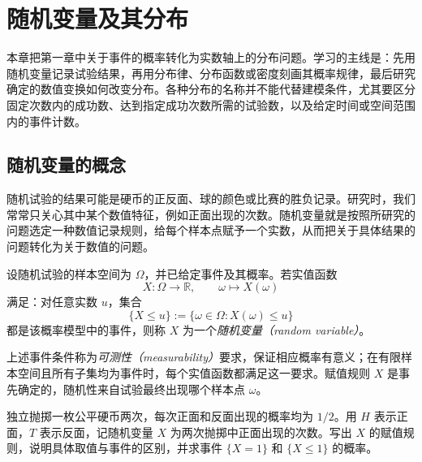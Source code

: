\setcounter{chapter}{1} %
\chapter{随机变量及其分布}
\label{chap:study-random-variables}

本章把第一章中关于事件的概率转化为实数轴上的分布问题。学习的主线是：先用随机变量记录试验结果，再用分布律、分布函数或密度刻画其概率规律，最后研究确定的数值变换如何改变分布。各种分布的名称并不能代替建模条件，尤其要区分固定次数内的成功数、达到指定成功次数所需的试验数，以及给定时间或空间范围内的事件计数。

\section{随机变量的概念}
\label{sec:study-random-variable-concept}

随机试验的结果可能是硬币的正反面、球的颜色或比赛的胜负记录。研究时，我们常常只关心其中某个数值特征，例如正面出现的次数。随机变量就是按照所研究的问题选定一种数值记录规则，给每个样本点赋予一个实数，从而把关于具体结果的问题转化为关于数值的问题。

\begin{definition}
\label{def:study-random-variable}
设随机试验的样本空间为 $\Omega$，并已给定事件及其概率。若实值函数
\[
  X:\Omega\longrightarrow\mathbb R,\qquad
  \omega\longmapsto X(\omega)
\]
满足：对任意实数 $u$，集合
\begin{equation}
  \{X\le u\}:=\{\omega\in\Omega:X(\omega)\le u\}
  \label{eq:study-random-variable-measurability}
\end{equation}
都是该概率模型中的事件，则称 $X$ 为一个\emph{随机变量（random variable）}。
\end{definition}

上述事件条件称为\emph{可测性（measurability）}要求，保证相应概率有意义；在有限样本空间且所有子集均为事件时，每个实值函数都满足这一要求。赋值规则 $X$ 是事先确定的，随机性来自试验最终出现哪个样本点 $\omega$。

\begin{example}
\label{ex:study-random-variable-two-coins}
独立抛掷一枚公平硬币两次，每次正面和反面出现的概率均为 $1/2$。用 $H$ 表示正面，$T$ 表示反面，记随机变量 $X$ 为两次抛掷中正面出现的次数。写出 $X$ 的赋值规则，说明具体取值与事件的区别，并求事件 $\{X=1\}$ 和 $\{X\le1\}$ 的概率。
\end{example}

